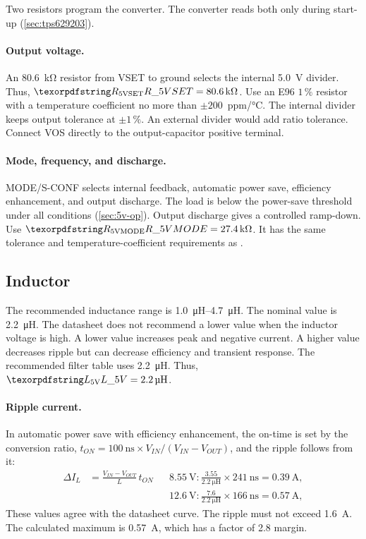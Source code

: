 Two resistors program the converter. The converter reads both only during
start-up (\cref{sec:tps629203}).

\paragraph{Output voltage.} An \SI{80.6}{\kilo\ohm} resistor from VSET to ground
selects the internal \SI{5.0}{\volt} divider. Thus,
$\des{R}{5VSET} = \SI{80.6}{\kilo\ohm}$. Use an E96 $1\,\%$ resistor with a
temperature coefficient no more than $\pm200$~ppm/\si{\celsius}. The internal
divider keeps output tolerance at $\pm1\,\%$. An external divider would add
ratio tolerance. Connect VOS directly to the output-capacitor positive terminal.

\paragraph{Mode, frequency, and discharge.} MODE/S-CONF selects internal
feedback, automatic power save, efficiency enhancement, and output discharge.
The load is below the power-save threshold under all conditions
(\cref{sec:5v-op}). Output discharge gives a controlled ramp-down. Use
$\des{R}{5VMODE} = \SI{27.4}{\kilo\ohm}$. It has the same tolerance and
temperature-coefficient requirements as .

\subsection{Inductor}\label{sec:5v-inductor}

The recommended inductance range is \SIrange{1.0}{4.7}{\micro\henry}. The
nominal value is \SI{2.2}{\micro\henry}. The datasheet does not recommend a
lower value when the inductor voltage is high. A lower value increases peak and
negative current. A higher value decreases ripple but can decrease efficiency
and transient response. The recommended filter table uses
\SI{2.2}{\micro\henry}. Thus, $\des{L}{5V} = \SI{2.2}{\micro\henry}$.

\paragraph{Ripple current.} In automatic power save with efficiency enhancement,
the on-time is set by the conversion ratio,
$t_{ON} = \SI{100}{\nano\second}\times V_{IN}/(V_{IN}-V_{OUT})$, and the ripple
follows from it:
\begin{align*}
  \Delta I_L &= \frac{V_{IN}-V_{OUT}}{L}\,t_{ON}
  &&\SI{8.55}{\volt}: \frac{3.55}{\SI{2.2}{\micro\henry}}\times\SI{241}{\nano\second}
     = \SI{0.39}{\ampere}, \\
  &&&\SI{12.6}{\volt}: \frac{7.6}{\SI{2.2}{\micro\henry}}\times\SI{166}{\nano\second}
     = \SI{0.57}{\ampere},
\end{align*}
These values agree with the datasheet curve. The ripple must not exceed
\SI{1.6}{\ampere}. The calculated maximum is \SI{0.57}{\ampere}, which has a
factor of 2.8 margin.

